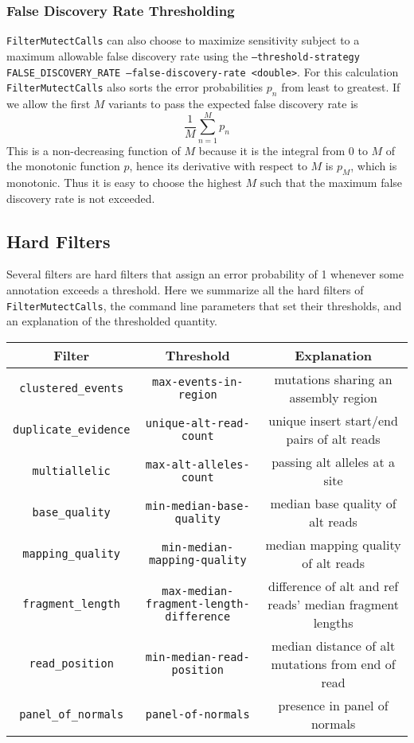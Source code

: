\documentclass[nofootinbib,amssymb,amsmath]{revtex4}
\newcommand{\code}[1]{\texttt{#1}}
\begin{document}
\subsubsection{False Discovery Rate Thresholding}
\code{FilterMutectCalls} can also choose to maximize sensitivity subject to a maximum allowable false discovery rate using the \code{--threshold-strategy FALSE\_DISCOVERY\_RATE --false-discovery-rate <double>}.  For this calculation \code{FilterMutectCalls} also sorts the error probabilities $p_n$ from least to greatest.  If we allow the first $M$ variants to pass the expected false discovery rate is
\begin{equation}
\frac{1}{M} \sum_{n = 1}^{M} p_n
\end{equation}
This is a non-decreasing function of $M$ because it is the integral from $0$ to $M$ of the monotonic function $p$, hence its derivative with respect to $M$ is $p_M$, which is monotonic.  Thus it is easy to choose the highest $M$ such that the maximum false discovery rate is not exceeded.

\subsection{Hard Filters}
Several filters are hard filters that assign an error probability of 1 whenever some annotation exceeds a threshold.  Here we summarize all the hard filters of \code{FilterMutectCalls}, the command line parameters that set their thresholds, and an explanation of the thresholded quantity.

\begin{table}[h!]
\centering
 \begin{tabular}{|| c c c ||} 
 \hline
 Filter & Threshold & Explanation \\ [0.5ex] 
 \hline\hline
 \code{clustered\_events} & \code{max-events-in-region} & mutations sharing an assembly region \\
 \code{duplicate\_evidence} & \code{unique-alt-read-count} & unique insert start/end pairs of alt reads \\
 \code{multiallelic} & \code{max-alt-alleles-count} & passing alt alleles at a site \\
 \code{base\_quality} & \code{min-median-base-quality} & median base quality of alt reads \\
 \code{mapping\_quality} & \code{min-median-mapping-quality} & median mapping quality of alt reads \\
 \code{fragment\_length} & \code{max-median-fragment-length-difference} & difference of alt and ref reads' median fragment lengths \\
 \code{read\_position} &\code{min-median-read-position} & median distance of alt mutations from end of read \\
 \code{panel\_of\_normals} & \code{panel-of-normals}  & presence in panel of normals \\
 \hline
 \end{tabular}
\end{table}
\end{document}
